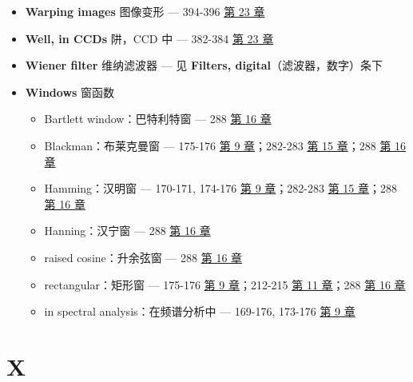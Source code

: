 \begin{itemize}
\tightlist
\item
  \textbf{Warping images} 图像变形 --- 394-396 
  \hyperref[ch-23]{第 23 章}
\item
  \textbf{Well, in CCDs} 阱，CCD 中 --- 382-384 
  \hyperref[ch-23]{第 23 章}
\item
  \textbf{Wiener filter} 维纳滤波器 --- 见 \textbf{Filters,
  digital}（滤波器，数字）条下
\item
  \textbf{Windows} 窗函数

  \begin{itemize}
  \tightlist
  \item
    Bartlett window：巴特利特窗 --- 288  \hyperref[ch-16]{第
    16 章}
  \item
    Blackman：布莱克曼窗 --- 175-176  \hyperref[ch-09]{第 9
    章}；282-283  \hyperref[ch-15]{第 15 章}；288 
    \hyperref[ch-16]{第 16 章}
  \item
    Hamming：汉明窗 --- 170-171, 174-176  \hyperref[ch-09]{第
    9 章}；282-283  \hyperref[ch-15]{第 15 章}；288 
    \hyperref[ch-16]{第 16 章}
  \item
    Hanning：汉宁窗 --- 288  \hyperref[ch-16]{第 16 章}
  \item
    raised cosine：升余弦窗 --- 288  \hyperref[ch-16]{第 16
    章}
  \item
    rectangular：矩形窗 --- 175-176  \hyperref[ch-09]{第 9
    章}；212-215  \hyperref[ch-11]{第 11 章}；288 
    \hyperref[ch-16]{第 16 章}
  \item
    in spectral analysis：在频谱分析中 --- 169-176, 173-176 
    \hyperref[ch-09]{第 9 章}
  \end{itemize}
\end{itemize}

\section{X}

